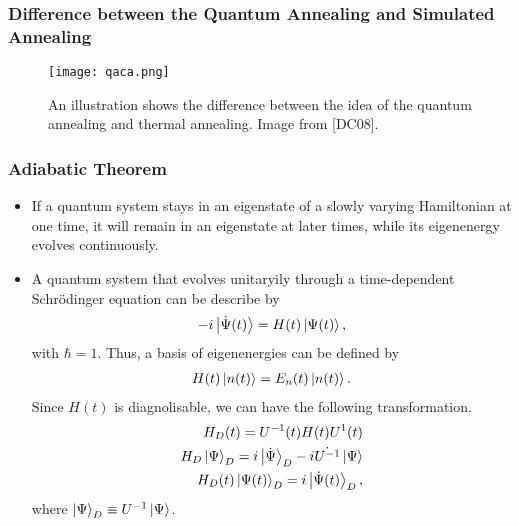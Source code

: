 \documentclass{beamer}
\begin{document}
\begin{frame}
	\frametitle{Difference between the Quantum Annealing and Simulated Annealing}
	\begin{figure}[h]
		\centering
		\texttt{[image: qaca.png]}
		\caption{An illustration shows the difference between the idea of the quantum annealing and thermal annealing. Image from [DC08]\footnotemark[1]. }
		\label{diff_qa_ca}
	\end{figure}
\end{frame}

\begin{frame}
	\frametitle{Adiabatic Theorem}
	\begin{itemize}
		\item 	If a quantum system stays in an eigenstate of a slowly varying Hamiltonian at one time, it will remain in an eigenstate at later times, while its eigenenergy evolves continuously.\\
		\item 	A quantum system that evolves unitaryily through a time-dependent Schrödinger equation can be describe by 
		\begin{equation*}
		\begin{split}
		-i\ket{\dot{\Psi}(t)} = H(t)\ket{\Psi(t)},
		\end{split}
		\end{equation*}
		with $\hbar = 1$. Thus, a basis of eigenenergies can be defined by 
		\begin{equation*}
		\begin{split}
		H(t)\ket{n(t)}=E_n(t)\ket{n(t)}.
		\end{split}
		\end{equation*}		
		Since $H(t)$ is diagnolisable, we can have the following transformation.
		\begin{equation*}
		\begin{split}
		H_D(t)=U^{-1}(t)H(t)U^{1}(t)\\
		H_D\ket{\Psi}_D = i \ket{\dot{\Psi}}_D - i \dot{U^{-1}} \ket{\Psi}\\
		H_D(t)\ket{\Psi(t)}_D = i \ket{\dot{\Psi}(t)}_D,
		\end{split}
		\end{equation*}
		where $\ket{\Psi}_D \equiv U^{-1}\ket{\Psi}$.
	\end{itemize}


\end{frame}
\end{document}
